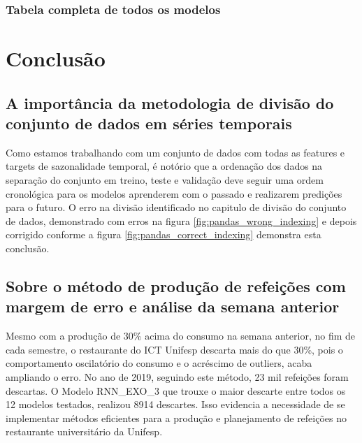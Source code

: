 \documentclass[	12pt, Times, openright, twoside, a4paper, english, brazil]{abntex2}
\begin{document}
        \subsection{Tabela completa de todos os modelos}
	    
  \chapter{Conclusão}
    \section{A importância da metodologia de divisão do conjunto de dados em séries temporais}
        Como estamos trabalhando com um conjunto de dados com todas as features e targets de sazonalidade temporal, é notório que a ordenação dos dados na separação do conjunto em treino, teste e validação deve seguir uma ordem cronológica para os modelos aprenderem com o passado e realizarem predições para o futuro. 
        O erro na divisão identificado no capitulo de divisão do conjunto de dados, demonstrado com erros na figura \ref{fig:pandas_wrong_indexing} e depois corrigido conforme a figura \ref{fig:pandas_correct_indexing} demonstra esta conclusão.

    \section{Sobre o método de produção de refeições com margem de erro e análise da semana anterior}
        Mesmo com a produção de 30\% acima do consumo na semana anterior, no fim de cada semestre, o restaurante do ICT Unifesp descarta mais do que 30\%, pois o comportamento oscilatório do consumo e o acréscimo de outliers, acaba ampliando o erro. No ano de 2019, seguindo este método, 23 mil refeições foram descartas.
        O Modelo RNN\_EXO\_3 que trouxe o maior descarte entre todos os 12 modelos testados, realizou 8914 descartes.
        Isso evidencia a necessidade de se implementar métodos eficientes para a produção e planejamento de refeições no restaurante universitário da Unifesp.
    
\end{document}
